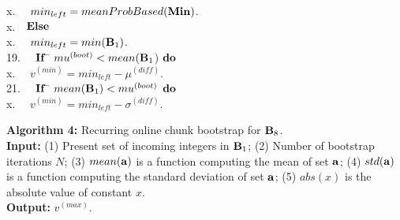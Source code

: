 \documentclass[lettersize,journal]{IEEEtran}
\begin{document}
\begin{tabbing}
x.~~\>     \> $min_{left} = meanProbBased({\bf Min})$.\\
x.~~\>${\bf Else}$\\
x.~~\>      \> $min_{left} = min({\bf B}_{1})$.\\
19.~~\> ${\bf If}$ \= $mu^{(boot)} < mean({\bf B}_{1}$) ${\bf do}$ \\
x.~~\>            \> $v^{(min)} = min_{left} - \mu^{(diff)}$. \\ 
21.~~\> ${\bf If}$ \= $mean({\bf B}_{1}) < mu^{(boot)}$ ${\bf do}$ \\
x.~~\>            \> $v^{(min)} = min_{left} - \sigma^{(diff)}$. \\ 
\end{tabbing}


\vspace{0.2in}
\noindent
{\bf Algorithm 4:} Recurring online chunk bootstrap for ${\bf B}_{8}$. \\

\noindent
{\bf Input:} (1) Present set of incoming integers in ${\bf B}_{1}$; (2) Number of bootstrap iterations 
$N$; (3) $mean({\bf a})$ is a function computing the mean of set ${\bf a}$; (4) $std({\bf a})$ is a 
function computing the standard deviation of set ${\bf a}$; (5) $abs(x)$ is the absolute value of 
constant $x$. \\
{\bf Output:} $v^{(max)}$.
\end{document}
